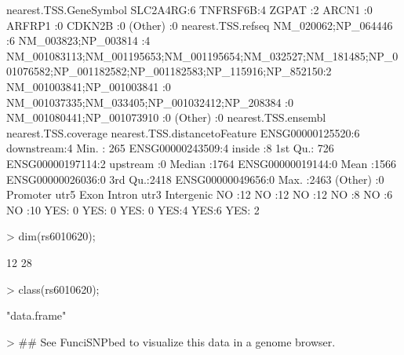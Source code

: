 \documentclass[a4paper]{article}
\begin{document}
\begin{Schunk}
\begin{Soutput}
 nearest.TSS.GeneSymbol
 SLC2A4RG:6            
 TNFRSF6B:4            
 ZGPAT   :2            
 ARCN1   :0            
 ARFRP1  :0            
 CDKN2B  :0            
 (Other) :0            
                                                                                                             nearest.TSS.refseq
 NM_020062;NP_064446                                                                                                  :6       
 NM_003823;NP_003814                                                                                                  :4       
 NM_001083113;NM_001195653;NM_001195654;NM_032527;NM_181485;NP_001076582;NP_001182582;NP_001182583;NP_115916;NP_852150:2       
 NM_001003841;NP_001003841                                                                                            :0       
 NM_001037335;NM_033405;NP_001032412;NP_208384                                                                        :0       
 NM_001080441;NP_001073910                                                                                            :0       
 (Other)                                                                                                              :0       
      nearest.TSS.ensembl nearest.TSS.coverage nearest.TSS.distancetoFeature
 ENSG00000125520:6        downstream:4         Min.   : 265                 
 ENSG00000243509:4        inside    :8         1st Qu.: 726                 
 ENSG00000197114:2        upstream  :0         Median :1764                 
 ENSG00000019144:0                             Mean   :1566                 
 ENSG00000026036:0                             3rd Qu.:2418                 
 ENSG00000049656:0                             Max.   :2463                 
 (Other)        :0                                                          
 Promoter  utr5     Exon    Intron   utr3   Intergenic
 NO :12   NO :12   NO :12   NO :8   NO :6   NO :10    
 YES: 0   YES: 0   YES: 0   YES:4   YES:6   YES: 2    
\end{Soutput}
\begin{Sinput}
> dim(rs6010620);
\end{Sinput}
\begin{Soutput}
[1] 12 28
\end{Soutput}
\begin{Sinput}
> class(rs6010620);
\end{Sinput}
\begin{Soutput}
[1] "data.frame"
\end{Soutput}
\begin{Sinput}
> ## See FunciSNPbed to visualize this data in a genome browser.
\end{Sinput}
\end{Schunk}
\end{document}
